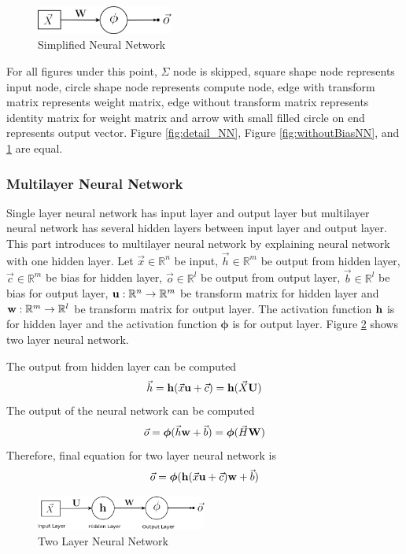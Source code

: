 \documentclass[draft,dvipsnames]{drexel-thesis}
\begin{document}
\begin{thesis}
\begin{figure}[t!]
    \centering
    \includegraphics[width=0.4\textwidth]{pictures/figures/NN.png}
    \caption{Simplified Neural Network}
    \label{fig:NN}
\end{figure}

	For all figures under this point, $\Sigma$ node is skipped, square shape node represents input node, circle shape node represents compute node, edge with transform matrix represents weight matrix, edge without transform matrix represents identity matrix for weight matrix and arrow with small filled circle on end represents output vector. Figure \ref{fig:detail_NN}, Figure \ref{fig:withoutBiasNN}, and \ref{fig:NN} are equal.


\subsubsection{Multilayer Neural Network}\label{subsubsec:MNN}
Single layer neural network has input layer and output layer but multilayer neural network has several hidden layers between input layer and output layer. This part introduces to multilayer neural network by explaining neural network with one hidden layer. Let $\vec{x} \in \mathbb{R}^n$ be input, $\vec{h} \in \mathbb{R}^m$ be output from hidden layer, $\vec{c} \in \mathbb{R}^m$ be bias for hidden layer, $\vec{o} \in \mathbb{R}^l$ be output from output layer, $\vec{b} \in \mathbb{R}^l$ be bias for output layer, $\bold{u}: \mathbb{R}^n \rightarrow \mathbb{R}^m$ be transform matrix for hidden layer and $\bold{w}: \mathbb{R}^m \rightarrow \mathbb{R}^l$ be transform matrix for output layer. The activation function $\bold{h}$ is for hidden layer and the activation function $\bm{\phi}$ is for output layer. Figure \ref{fig:MNN} shows two layer neural network.

The output from hidden layer can be computed
$$\vec{h} = \bold{h}(\vec{x}\bold{u}+\vec{c}) = \bold{h}(\vec{X}\bold{U})$$
The output of the neural network can be computed
$$\vec{o} = \bm{\phi}(\vec{h}\bold{w}+\vec{b}) = \bm{\phi}(\vec{H}\bold{W})$$
Therefore, final equation for two layer neural network is
$$\vec{o} = \bm{\phi}(\bold{h}(\vec{x}\bold{u}+\vec{c})\bold{w}+\vec{b})$$

\begin{figure}[t!]
    \centering
    \includegraphics[width=0.5\textwidth]{pictures/figures/MNN.png}
    \caption{Two Layer Neural Network}
    \label{fig:MNN}
\end{figure}



\end{thesis}
\end{document}
